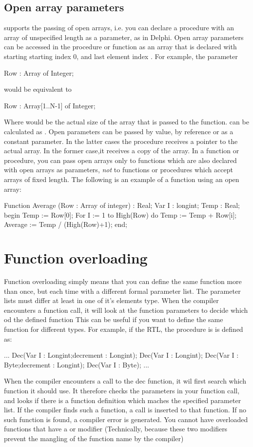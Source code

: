 \documentclass{report}
\begin{document}
\subsection{Open array parameters}
\label{se:openarray}
\fpc supports the passing of open arrays, i.e. you can declare a procedure
with an array of unspecified length as a parameter, as in Delphi.
Open array parameters can be accessed in the procedure or function as an
array that is declared with starting starting index 0, and last element 
index .
For example, the parameter
\begin{listing}
Row : Array of Integer;
\end{listing}
would be equivalent to
\begin{listing}
Row : Array[1..N-1] of Integer;
\end{listing}
Where   would be the actual size of the array that is passed to the
function.  can be calculated as .
Open parameters can be passed by value, by reference or as a constant 
parameter. In the latter cases the procedure receives a pointer to the
actual array. In the former case,it receives a copy of the array.
In a function or procedure, you can pass open arrays only to functions which
are also declared with open arrays as parameters, {\em not} to functions or
procedures which accept arrays of fixed length.
The following is an example of a function using an open array: 
\begin{listing}
Function Average (Row : Array of integer) : Real;
Var I : longint;
    Temp : Real;
begin
  Temp := Row[0];
  For I := 1 to High(Row) do 
    Temp := Temp + Row[i];
  Average := Temp / (High(Row)+1);
end;
\end{listing}
\section{Function overloading}
Function overloading simply means that you can define the same function more
than once, but each time with a different formal parameter list.
The parameter lists must differ at least in one of it's elements type.
When the compiler encounters a function call, it will look at the function
parameters to decide which od the defined function
This can be useful if you want to define the same function for different
types. For example, if the RTL, the   procedure is
is defined as:
\begin{listing}
...
Dec(Var I : Longint;decrement : Longint);
Dec(Var I : Longint);
Dec(Var I : Byte;decrement : Longint);
Dec(Var I : Byte);
...
\end{listing}
When the compiler encounters a call to the dec function, it wil first search
which function it should use. It therefore checks the parameters in your
function call, and looks if there is a function definition which maches the
specified parameter list. If the compiler finds such a function, a call is
inserted to that function. If no such function is found, a compiler error is
generated.
You cannot have overloaded functions that have a  or 
modifier (Technically, because these two modifiers prevent the mangling of 
the function name by the compiler)
\end{document}
